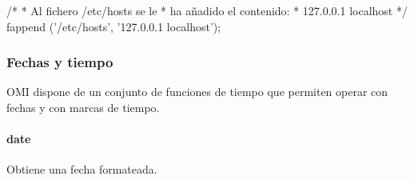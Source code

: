 \begin{myverbatim}  
   /*
   * Al fichero /etc/hosts se le
   * ha añadido el contenido:
   * 127.0.0.1 localhost
   */
   fappend ('/etc/hosts', '127.0.0.1 localhost');
\end{myverbatim}

\subsubsection{Fechas y tiempo}
OMI dispone de un conjunto de funciones de tiempo que permiten operar con fechas y con marcas de tiempo. 

\paragraph{date}
Obtiene una fecha formateada.  

